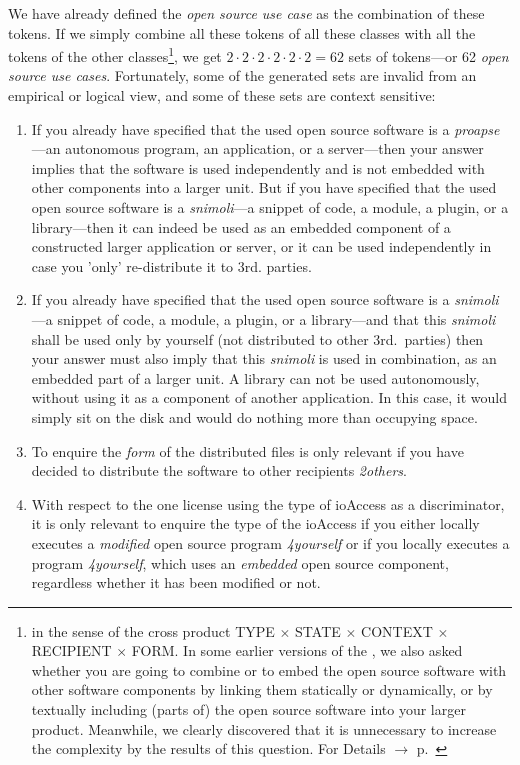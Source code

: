 We have already defined the \emph{open source use case} as the combination of
these tokens. If we simply combine all these tokens of all these classes with
all the tokens of the other classes\footnote{in the sense of the cross product
TYPE $\times$ STATE $\times$ CONTEXT $\times$ RECIPIENT $\times$ FORM. In some
earlier versions of the \oslic{}, we also asked whether you are going to combine
or to embed the open source software with other software components by linking
them statically or dynamically, or by textually including (parts of) the open
source software into your larger product. Meanwhile, we clearly discovered that
it is unnecessary to increase the complexity by the results of this question.
For Details $\rightarrow$ \oslic{} p.\ \pageref{sec:LinkingSecondary}}, we get
$2 \cdot 2 \cdot 2 \cdot 2 \cdot 2 \cdot 2 = 62$ sets of tokens---or 62
\emph{open source use cases}. Fortunately, some of the generated sets are
invalid from an empirical or logical view, and some of these sets are context
sensitive:

\begin{enumerate}
  \label{InvalidFinderTokenCombinations}
  \item If you already have specified that the used open source software is a
  \emph{proapse}---an autonomous program, an application, or a server---then
  your answer implies that the software is used independently and is not
  embedded with other components into a larger unit. But if you have specified
  that the used open source software is a \emph{snimoli}---a snippet of
  code, a module, a plugin, or a library---then it can indeed be used as an
  embedded component of a constructed larger application or server, or it can be
  used independently in case you 'only' re-distribute it to 3rd. parties.
  
  \item If you already have specified that the used open source software is a
  \emph{snimoli}---a snippet of code, a module, a plugin, or a library---and
  that this \emph{snimoli} shall be used only by yourself (not distributed to
  other 3rd.\ parties) then your answer must also imply that this \emph{snimoli}
  is used in combination, as an embedded part of a larger unit. A library can
  not be used autonomously, without using it as a component of another
  application. In this case, it would simply sit on the disk and would do
  nothing more than occupying space.
  
  \item To enquire the \emph{form} of the distributed files is only relevant if you
  have decided to distribute the software to other recipients \emph{2others}.
  
  \item With respect to the one license using the type of ioAccess as a
  discriminator, it is only relevant to enquire the type of the ioAccess if you
  either locally executes a \emph{modified} open source program \emph{4yourself}
  or if you locally executes a program \emph{4yourself}, which uses an
  \emph{embedded} open source component, regardless whether it has been modified
  or not.
  
\end{enumerate}

